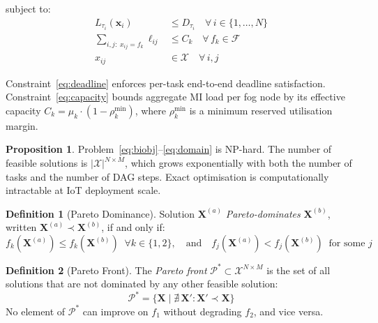 \documentclass[12pt,a4paper]{article}
\theoremstyle{definition}
\newtheorem{definition}{Definition}[section]
\newtheorem{proposition}{Proposition}[section]
\theoremstyle{remark}
\begin{document}
subject to:
\begin{align}
  L_{\tau_i}(\mathbf{x}_i) &\leq D_{\tau_i}
    \quad \forall\, i \in \{1,\ldots,N\}
    \label{eq:deadline}\\
  \sum_{i,j:\; x_{ij}=f_k} \ell_{ij} &\leq C_k
    \quad \forall\, f_k \in \mathcal{F}
    \label{eq:capacity}\\
  x_{ij} &\in \mathcal{X}
    \quad \forall\, i, j
    \label{eq:domain}
\end{align}

Constraint~\eqref{eq:deadline} enforces per-task end-to-end deadline satisfaction.
Constraint~\eqref{eq:capacity} bounds aggregate MI load per fog node by its
effective capacity $C_k = \mu_k \cdot (1 - \rho_k^{\min})$, where
$\rho_k^{\min}$ is a minimum reserved utilisation margin.

\begin{proposition}
Problem~\eqref{eq:biobj}--\eqref{eq:domain} is NP-hard. The number of feasible
solutions is $|\mathcal{X}|^{N \times M}$, which grows exponentially with both
the number of tasks and the number of DAG steps. Exact optimisation is
computationally intractable at IoT deployment scale.
\end{proposition}

\begin{definition}[Pareto Dominance]
Solution $\mathbf{X}^{(a)}$ \emph{Pareto-dominates} $\mathbf{X}^{(b)}$,
written $\mathbf{X}^{(a)} \prec \mathbf{X}^{(b)}$, if and only if:
\begin{equation}
  f_k(\mathbf{X}^{(a)}) \leq f_k(\mathbf{X}^{(b)}) \;\; \forall k \in \{1,2\},
  \quad\text{and}\quad
  f_j(\mathbf{X}^{(a)}) < f_j(\mathbf{X}^{(b)}) \;\; \text{for some } j
  \label{eq:dominance}
\end{equation}
\end{definition}

\begin{definition}[Pareto Front]
The \emph{Pareto front} $\mathcal{P}^* \subset \mathcal{X}^{N \times M}$
is the set of all solutions that are not dominated by any other feasible solution:
\begin{equation}
  \mathcal{P}^* = \bigl\{ \mathbf{X} \mid \nexists\, \mathbf{X}' :
  \mathbf{X}' \prec \mathbf{X} \bigr\}
\end{equation}
No element of $\mathcal{P}^*$ can improve on $f_1$ without degrading $f_2$,
and vice versa.
\end{definition}

\end{document}

